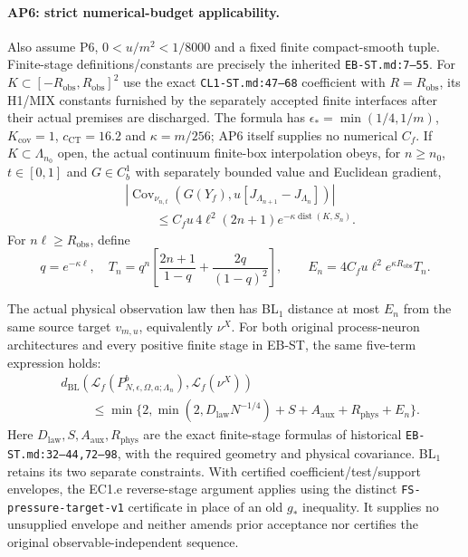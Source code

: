 \documentclass[11pt]{article}
\theoremstyle{plain}
\theoremstyle{definition}
\theoremstyle{remark}
\begin{document}
\paragraph{AP6: strict numerical-budget applicability.}
Also assume P6, $0<u/m^2<1/8000$ and a fixed finite compact-smooth tuple.
Finite-stage definitions/constants are precisely the inherited
\texttt{EB-ST.md:7--55}. For $K\subset[-R_{\mathrm{obs}},R_{\mathrm{obs}}]^2$
use the exact \texttt{CL1-ST.md:47--68} coefficient with
$R=R_{\mathrm{obs}}$, its H1/MIX constants furnished by the separately
accepted finite interfaces after their actual premises are discharged.
The formula has $\epsilon_*=\min(1/4,1/m)$, $K_{\mathrm{cov}}=1$,
$c_{\mathrm{CT}}=16.2$ and $\kappa=m/256$; AP6 itself supplies no
numerical $C_f$. If $K\subset\Lambda_{n_0}$ open, the actual continuum
finite-box interpolation obeys, for $n\ge n_0$, $t\in[0,1]$ and
$G\in C_b^1$ with separately bounded value and Euclidean gradient,
\begin{align*}
 &\left|\operatorname{Cov}_{\nu_{n,t}}
 \left(G(Y_f),u[J_{\Lambda_{n+1}}-J_{\Lambda_n}]\right)\right|\\
 &\hspace{1cm}\le C_f u\,4\ell^2(2n+1)e^{-\kappa\operatorname{dist}(K,S_n)}.
\end{align*}
For $n\ell\ge R_{\mathrm{obs}}$, define
\[
 q=e^{-\kappa\ell},\quad
 T_n=q^n\left[\frac{2n+1}{1-q}+\frac{2q}{(1-q)^2}\right],\qquad
 E_n=4C_f u\ell^2e^{\kappa R_{\mathrm{obs}}}T_n.
\]

The actual physical observation law then has BL$_1$ distance at most
$E_n$ from the same source target $v_{m,u}$, equivalently $\nu^X$.
For both original process-neuron architectures and every positive finite
stage in EB-ST, the same five-term expression holds:
\begin{align*}
 &d_{\mathrm{BL}}\left(\mathcal L_f(P^b_{N,\epsilon,\Omega,a;\Lambda_n}),
                                 \mathcal L_f(\nu^X)\right)\\
 &\hspace{1cm}\le\min\{2,\min(2,D_{\mathrm{law}}N^{-1/4})
              +S+A_{\mathrm{aux}}+R_{\mathrm{phys}}+E_n\}.
\end{align*}
Here $D_{\mathrm{law}},S,A_{\mathrm{aux}},R_{\mathrm{phys}}$ are the exact
finite-stage formulas of historical \texttt{EB-ST.md:32--44,72--98}, with
the required geometry and physical covariance. BL$_1$ retains its two
separate constraints. With certified coefficient/test/support envelopes,
the EC1.e reverse-stage argument applies using the distinct
\texttt{FS-pressure-target-v1} certificate in place of an old $g_*$
inequality. It supplies no unsupplied envelope and neither amends prior
acceptance nor certifies the original observable-independent sequence.
\end{document}
